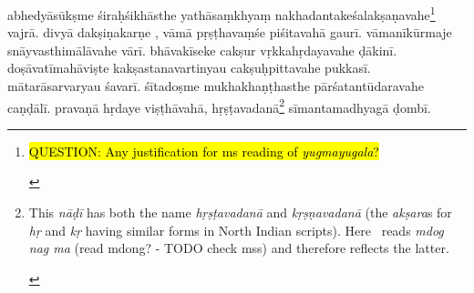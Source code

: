 \documentclass[naipra.tex]{subfiles}
\begin{document}
\begin{sanskrit}
\pstart
abhedyāsūkṣme śiraḥśikhāsthe yathāsaṃkhyaṃ nakhadantakeśalakṣaṇavahe\footnote{\begin{english}
	\hl{QUESTION: Any justification for ms reading of \emph{yugmayugala}?}
\end{english}} vajrā. 
divyā dakṣiṇakarṇe , vāmā pṛṣṭhavaṃśe piśitavahā gaurī. 
vāmanīkūrmaje  snāyvasthimālāvahe vārī. 
bhāvakīseke cakṣur vṛkkahṛdayavahe ḍākinī. 
doṣāvatīmahāviṣte kakṣastanavartinyau cakṣuḥpittavahe pukkasī.
mātarāsarvaryau   śavarī.
śītadoṣme mukhakhaṇṭhasthe pārśatantūdaravahe caṇḍālī. 
pravaṇā hṛdaye viṣṭhāvahā, hṛṣṭavadanā\footnote{\begin{english}
	This \emph{nāḍī} has both the name \emph{hṛṣṭavadanā} and \emph{kṛṣṇavadanā} (the \emph{akṣara}s for \emph{hṛ} and \emph{kṛ} having similar forms in North Indian scripts).
	Here \TIB\ reads \emph{mdog nag ma} (read mdong? - TODO check mss) and therefore reflects the latter.
\end{english}}  sīmantamadhyagā ḍombī. 
\pend




\end{sanskrit}
\end{document}
